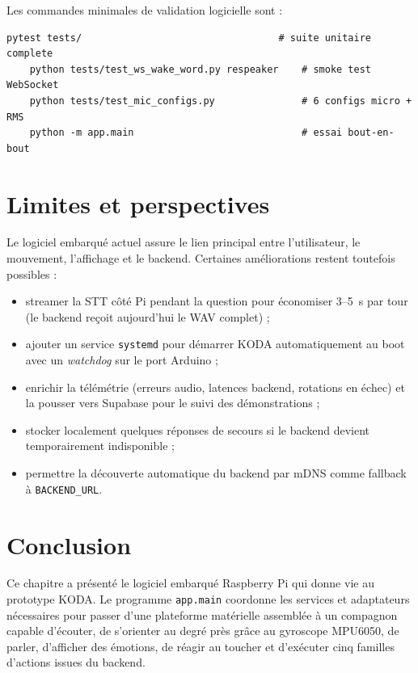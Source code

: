 \documentclass[a4paper,12pt]{report}
\begin{document}
	Les commandes minimales de validation logicielle sont :
	
	\begin{lstlisting}[style=kodatest, language=shellkoda, caption={Commandes de validation du Cycle 4}]
	pytest tests/                                  # suite unitaire complete
	python tests/test_ws_wake_word.py respeaker    # smoke test WebSocket
	python tests/test_mic_configs.py               # 6 configs micro + RMS
	python -m app.main                             # essai bout-en-bout
	\end{lstlisting}
	
	\section{Limites et perspectives}
	
	Le logiciel embarqué actuel assure le lien principal entre l'utilisateur, le
	mouvement, l'affichage et le backend. Certaines améliorations restent
	toutefois possibles :
	\begin{itemize}
		\item streamer la STT côté Pi pendant la question pour économiser
		3--5~s par tour (le backend reçoit aujourd'hui le WAV complet) ;
		\item ajouter un service \texttt{systemd} pour démarrer KODA
		automatiquement au boot avec un \emph{watchdog} sur le port Arduino ;
		\item enrichir la télémétrie (erreurs audio, latences backend,
		rotations en échec) et la pousser vers Supabase pour le suivi des
		démonstrations ;
		\item stocker localement quelques réponses de secours si le backend
		devient temporairement indisponible ;
		\item permettre la découverte automatique du backend par mDNS comme
		fallback à \texttt{BACKEND\_URL}.
	\end{itemize}
	
	\section{Conclusion}
	
	Ce chapitre a présenté le logiciel embarqué Raspberry Pi qui donne vie au
	prototype KODA. Le programme \texttt{app.main} coordonne les services et
	adaptateurs nécessaires pour passer d'une plateforme matérielle assemblée
	à un compagnon capable d'écouter, de s'orienter au degré près grâce au
	gyroscope MPU6050, de parler, d'afficher des émotions, de réagir au
	toucher et d'exécuter cinq familles d'actions issues du backend.
	
\end{document}
